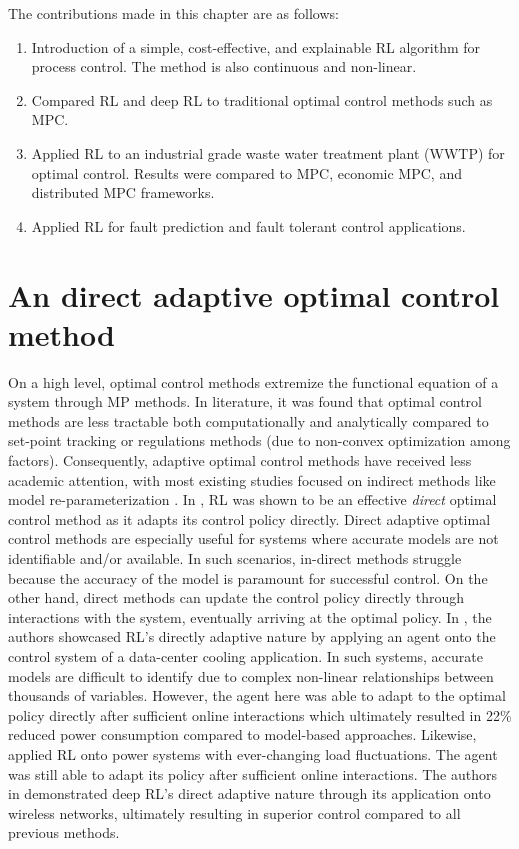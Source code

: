 The contributions made in this chapter are as follows:
\begin{enumerate}
    \item Introduction of a simple, cost-effective, and explainable RL algorithm for process control.  The method is also continuous and non-linear.
    \item Compared RL and deep RL to traditional optimal control methods such as MPC.
    \item Applied RL to an industrial grade waste water treatment plant (WWTP) for optimal control.  Results were compared to MPC, economic MPC, and distributed MPC frameworks.
    \item Applied RL for fault prediction and fault tolerant control applications.
\end{enumerate}


\section{An direct adaptive optimal control method}
On a high level, optimal control methods extremize the functional equation of a system through MP methods. In literature, it was found that optimal control methods are less tractable both computationally and analytically compared to set-point tracking or regulations methods (due to non-convex optimization among factors). Consequently, adaptive optimal control methods have received less academic attention, with most existing studies focused on indirect methods like model re-parameterization \cite{rl_control}.  In \cite{rl_control}, RL was shown to be an effective \textit{direct} optimal control method as it adapts its control policy directly. Direct adaptive optimal control methods are especially useful for systems where accurate models are not identifiable and/or available.  In such scenarios, in-direct methods struggle because the accuracy of the model is paramount for successful control.  On the other hand, direct methods can update the control policy directly through interactions with the system, eventually arriving at the optimal policy. In \cite{power_control}, the authors showcased RL's directly adaptive nature by applying an agent onto the control system of a data-center cooling application. In such systems, accurate models are difficult to identify due to complex non-linear relationships between thousands of variables. However, the agent here was able to adapt to the optimal policy directly after sufficient online interactions which ultimately resulted in 22\% reduced power consumption compared to model-based approaches.  Likewise, \cite{power_control2} applied RL onto power systems with ever-changing load fluctuations.  The agent was still able to adapt its policy after sufficient online interactions. The authors in \cite{power_control3} demonstrated deep RL's direct adaptive nature through its application onto wireless networks, ultimately resulting in superior control compared to all previous methods.


